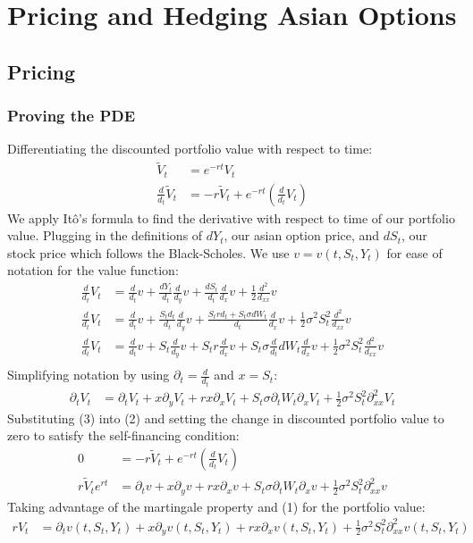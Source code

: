 \documentclass[a4paper,12pt]{article}
\begin{document}
\section{Pricing and Hedging Asian Options}

\subsection{Pricing}

\subsubsection{Proving the PDE}

Differentiating the discounted portfolio value with respect to time:
\begin{align}
\tilde{V}_t &= e^{-rt}V_t \\
\frac{d}{d_t}\tilde{V}_t &= -r \tilde{V}_t + e^{-rt} ( \frac{d}{d_t}V_t)
\end{align}
We apply It\^{o}'s formula to find the derivative with respect to time of our portfolio value. Plugging in the definitions of $dY_t$, our asian option price, and $dS_t$, our stock price which follows the Black-Scholes. We use $v = v(t, S_t, Y_t)$ for ease of notation for the value function:
%
\begin{align*}
\frac{d}{d_t}V_t & = \frac{d}{d_t}v + \frac{dY_t}{d_t}\frac{d}{d_y}v + \frac{dS_t}{d_t}\frac{d}{d_x}v + \frac{1}{2}\frac{d^2}{d_{xx}}v \\
\frac{d}{d_t}V_t &= \frac{d}{d_t}v + \frac{S_td_t}{d_t}\frac{d}{d_y}v + \frac{S_trd_t + S_t \sigma dW_t}{d_t}\frac{d}{d_x}v + \frac{1}{2}\sigma^2 S_t^2 \frac{d^2}{d_{xx}}v\\
\frac{d}{d_t}V_t &= \frac{d}{d_t}v + S_t \frac{d}{d_y}v + S_tr\frac{d}{d_x}v + S_t \sigma \frac{d}{d_t}dW_t \frac{d}{d_x}v + \frac{1}{2}\sigma^2 S_t^2 \frac{d^2}{d_{xx}}v\\
\end{align*}
%
Simplifying notation by using $\partial_t = \frac{d}{d_t}$ and $x = S_t$:
\begin{align}
\partial_t V_t &= \partial_t V_t + x \partial_y V_t + rx \partial_x V_t + S_t \sigma \partial_tW_t \partial_xV_t + \frac{1}{2}\sigma^2 S_t^2 \partial_{xx}^2 V_t
\end{align}
%
Substituting (3) into (2) and setting the change in discounted portfolio value to zero to satisfy the self-financing condition:
%
\begin{align*}
0 &= -r \tilde{V}_t + e^{-rt} ( \frac{d}{d_t}V_t) \\
r \tilde{V}_t e^{rt} &= \partial_t v + x \partial_y v + rx \partial_x v + S_t \sigma \partial_tW_t \partial_x v + \frac{1}{2}\sigma^2 S_t^2 \partial_{xx}^2 v
\end{align*}
%
Taking advantage of the martingale property and (1) for the portfolio value:
\begin{align*}
rV_t &= \partial_t v(t, S_t, Y_t) + x \partial_y v(t, S_t, Y_t) + rx \partial_x v(t, S_t, Y_t)  + \frac{1}{2}\sigma^2 S_t^2 \partial_{xx}^2 v(t, S_t, Y_t)
\end{align*}
\end{document}
